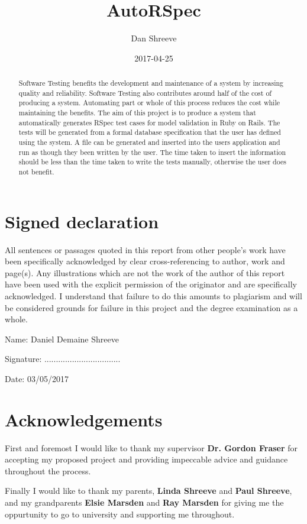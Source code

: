 \documentclass{article}
\title{AutoRSpec}
\date{2017-04-25}
\author{Dan Shreeve}
\begin{document}
\maketitle

\newpage
{}
\section*{Signed declaration}
All sentences or passages quoted in this report from other people's work have been specifically acknowledged by clear cross-referencing to author, work and page(s). Any illustrations which are not the work of the author of this report have been used with the explicit permission of the originator and are specifically acknowledged. I understand that failure to do this amounts to plagiarism and will be considered grounds for failure in this project and the degree examination as a whole.
\par Name: Daniel Demaine Shreeve
\par Signature: .................................
\par Date: 03/05/2017

\newpage
{}
\begin{abstract}
Software Testing benefits the development and maintenance of a system by increasing quality and reliability. Software Testing also contributes around half of the cost of producing a system. Automating part or whole of this process reduces the cost while maintaining the benefits. The aim of this project is to produce a system that automatically generates RSpec test cases for model validation in Ruby on Rails. The tests will be generated from a formal database specification that the user has defined using the system. A file can be generated and inserted into the users application and run as though they been written by the user. The time taken to insert the information should be less than the time taken to write the tests manually, otherwise the user does not benefit.
\end{abstract}

\newpage
{}
\section*{Acknowledgements}
First and foremost I would like to thank my supervisor \textbf{Dr. Gordon Fraser} for accepting my proposed project and providing impeccable advice and guidance throughout the process.
\par Finally I would like to thank my parents, \textbf{Linda Shreeve} and \textbf{Paul Shreeve}, and my grandparents \textbf{Elsie Marsden} and \textbf{Ray Marsden} for giving me the oppurtunity to go to university and supporting me throughout.
\end{document}
